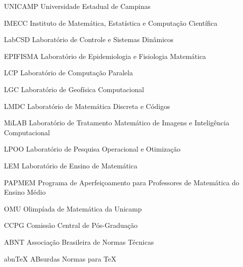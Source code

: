 \documentclass[
	oldfontcommands,
	sumario=abnt-6027-2012,
	12pt,			%
	openright,		%
	oneside,		%
	a4paper,		%
	english,		%
	brazil			%
	]{imecc-unicamp}
\begin{document}

\listoffigures*
\cleardoublepage
\listoftables*
\cleardoublepage
\begin{siglas}
  \item[UNICAMP] Universidade Estadual de Campinas
  \item[IMECC] Instituto de Matemática, Estatística e Computação Científica
  \item[LabCSD] Laboratório de Controle e Sistemas Dinâmicos
  \item[EPIFISMA] Laboratório de Epidemiologia e Fisiologia Matemática
  \item[LCP] Laboratório de Computação Paralela
  \item[LGC] Laboratório de Geofísica Computacional
  \item[LMDC] Laboratório de Matemática Discreta e Códigos
  \item[MiLAB] Laboratório de Tratamento Matemático de Imagens e Inteligência Computacional
  \item[LPOO] Laboratório de Pesquisa Operacional e Otimização
  \item[LEM] Laboratório de Ensino de Matemática
  \item[PAPMEM] Programa de Aperfeiçoamento para Professores de Matemática do Ensino Médio
  \item[OMU] Olimpíada de Matemática da Unicamp
  \item[CCPG] Comissão Central de Pós-Graduação
  \item[ABNT] Associação Brasileira de Normas Técnicas
  \item[abnTeX] ABsurdas Normas para TeX
\end{siglas}
\end{document}
